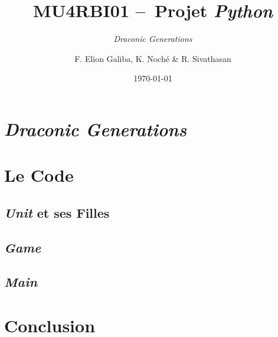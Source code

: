 \documentclass[12pt]{beamer}
\author{F. Elion Galiba, K. Noché \&{} R. Sivathasan}
\title{\textbf{MU4RBI01 --~Projet \emph{Python}}}
\subtitle{\emph{Draconic Generations}}
\institute{Sorbonne Université}
\date{\today}
\begin{document}
    \maketitle

    \section{\emph{Draconic Generations}} %

    \section{Le Code} %
        \subsection{\emph{Unit} et ses Filles}
        \subsection{\emph{Game}}
        \subsection{\emph{Main}}

    \section{Conclusion} %
\end{document}
